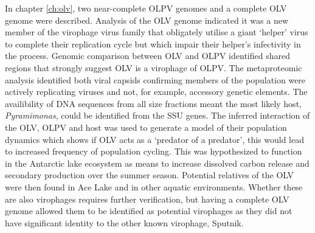 In chapter \ref{ch:olv}, two near-complete \ac{OLPV} genomes and a complete \ac{OLV} genome were described.
Analysis of the \ac{OLV} genome indicated it was a new member of the virophage virus family that obligately utilise a  giant `helper' virus to complete their replication cycle but which impair their helper's infectivity in the process.
Genomic comparison between \ac{OLV} and \ac{OLPV} identified shared regions that strongly suggest \ac{OLV} is a virophage of \ac{OLPV}.
The metaproteomic analysis identified both viral capsids confirming members of the population were actively replicating viruses and not, for example, accessory genetic elements.
The availibility of \textsc{DNA} sequences from all size fractions meant the most likely host, \emph{Pyramimonas}, could be identified from the \ac{SSU} genes.
The inferred interaction of the \ac{OLV}, \ac{OLPV} and host was used to generate a model of their population dynamics which shows if \ac{OLV} acts as a `predator of a predator', this would lead to increased frequency of population cycling.
This was hypothesized to function in the Antarctic lake ecosystem as means to increase dissolved carbon release and secondary production over the summer season.
Potential relatives of the \ac{OLV} were then found in Ace Lake and in other aquatic environments. 
Whether these are also virophages requires further verification, but having a complete \ac{OLV} genome allowed them to be identified as potential virophages as they did not have significant identity to the other known virophage, Sputnik.

